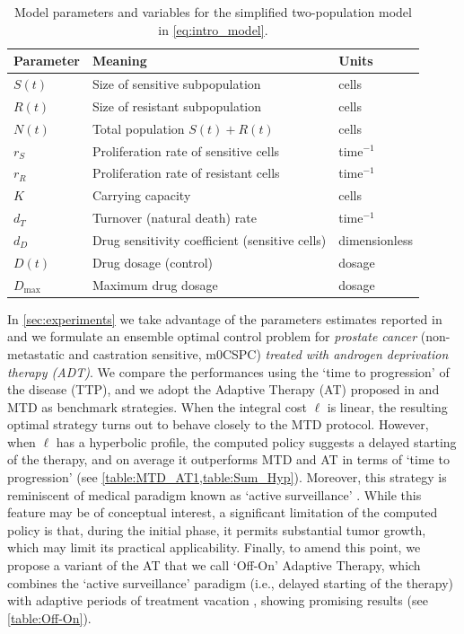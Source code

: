 \documentclass[a4paper,12pt, reqno]{amsart}
\theoremstyle{plain}
\theoremstyle{definition}
\theoremstyle{remark}
\numberwithin{equation}{section}
\begin{document}
\begin{table}[b]
\centering
\begin{tabular}{lll}
\toprule
\textbf{Parameter} & \textbf{Meaning} & \textbf{Units} \\
\midrule
$S(t)$ & Size of sensitive subpopulation & cells \\
$R(t)$ & Size of resistant subpopulation & cells \\
$N(t)$ & Total population $S(t)+R(t)$ & cells \\
$r_S$ & Proliferation rate of sensitive cells & time$^{-1}$ \\
$r_R$ & Proliferation rate of resistant cells & time$^{-1}$ \\
$K$ & Carrying capacity & cells \\
$d_T$ & Turnover (natural death) rate & time$^{-1}$ \\
$d_D$ & Drug sensitivity coefficient (sensitive cells) & dimensionless \\
$D(t)$ & Drug dosage (control) & dosage \\
$D_{\max}$ & Maximum drug dosage & dosage \\
\bottomrule
\end{tabular}
\caption{Model parameters and variables for the simplified two-population model in \cref{eq:intro_model}.}
\label{tab:simplified_parameters}
\end{table}
In \cref{sec:experiments} we take advantage of the parameters estimates reported in \cite{turnover2021} and we formulate an ensemble optimal control problem for \emph{prostate cancer} (non-metastatic and castration sensitive, m0CSPC) \emph{treated with androgen deprivation therapy (ADT)}. 
We compare the performances using the `time to progression' of the disease (TTP), and we adopt the Adaptive Therapy (AT) proposed in \cite{moff2009adaptive,moff2017zhang} and MTD as benchmark strategies.
When the integral cost $\ell$ is linear, the resulting optimal strategy turns out to behave closely to the MTD protocol. However, when $\ell$ has a hyperbolic profile, the computed policy suggests a delayed starting of the therapy, and on average it outperforms MTD and AT in terms of `time to progression' (see \cref{table:MTD_AT1,table:Sum_Hyp}). Moreover, this strategy is reminiscent of medical paradigm known as `active surveillance'   \cite{preisser2024european,karim2025early}. 
{While this feature may be of conceptual interest, a significant limitation of the computed policy is that, during the initial phase, it permits substantial tumor growth, which may limit its practical applicability.}
Finally, to amend this point, we propose a variant of the AT that we call `Off-On' Adaptive Therapy, which combines the `active surveillance' paradigm (i.e., delayed starting of the therapy) with adaptive periods of treatment vacation \cite{moff2009adaptive,moff2017zhang}, showing promising results (see \cref{table:Off-On}).
\end{document}

